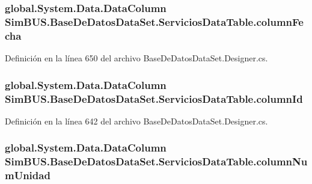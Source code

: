 \subsubsection[{column\-Fecha}]{\setlength{\rightskip}{0pt plus 5cm}global.\-System.\-Data.\-Data\-Column Sim\-B\-U\-S.\-Base\-De\-Datos\-Data\-Set.\-Servicios\-Data\-Table.\-column\-Fecha\hspace{0.3cm}{\ttfamily [private]}}\label{class_sim_b_u_s_1_1_base_de_datos_data_set_1_1_servicios_data_table_aec37019bf5c1c3ce7550f274c7166be2}


Definición en la línea 650 del archivo Base\-De\-Datos\-Data\-Set.\-Designer.\-cs.

\subsubsection[{column\-Id}]{\setlength{\rightskip}{0pt plus 5cm}global.\-System.\-Data.\-Data\-Column Sim\-B\-U\-S.\-Base\-De\-Datos\-Data\-Set.\-Servicios\-Data\-Table.\-column\-Id\hspace{0.3cm}{\ttfamily [private]}}\label{class_sim_b_u_s_1_1_base_de_datos_data_set_1_1_servicios_data_table_a4c21fee1177564c4addc8bd8f69b4fc1}


Definición en la línea 642 del archivo Base\-De\-Datos\-Data\-Set.\-Designer.\-cs.

\subsubsection[{column\-Num\-Unidad}]{\setlength{\rightskip}{0pt plus 5cm}global.\-System.\-Data.\-Data\-Column Sim\-B\-U\-S.\-Base\-De\-Datos\-Data\-Set.\-Servicios\-Data\-Table.\-column\-Num\-Unidad\hspace{0.3cm}{\ttfamily [private]}}\label{class_sim_b_u_s_1_1_base_de_datos_data_set_1_1_servicios_data_table_ac9e3be3537b2cc72694502f09084ffcb}


